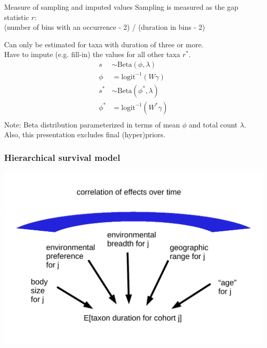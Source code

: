 \documentclass{beamer}
\begin{document}
\begin{frame}
  \begin{block}{Measure of sampling and imputed values}
    Sampling is measured as the gap statistic \(r\): \\(number of bins with an occurrence - 2) / (duration in bins - 2)

    Can only be estimated for taxa with duration of three or more. \\Have to impute (e.g. fill-in) the values for all other taxa \(r^{\ast}\).
    \begin{align*}
      s &\sim \text{Beta}(\phi, \lambda) \\
      \phi &= \text{logit}^{-1}(W\gamma) \\
      s^{\ast} &\sim \text{Beta}(\phi^{\ast}, \lambda) \\
      \phi^{\ast} &= \text{logit}^{-1}(W^{\ast}\gamma) \\
    \end{align*}
    \scriptsize{Note: Beta distribution parameterized in terms of mean \(\phi\) and total count \(\lambda\). \\Also, this presentation excludes final (hyper)priors.}
  \end{block}
\end{frame}


\begin{frame}
  \frametitle{Hierarchical survival model}
  \begin{center}
    \includegraphics[width = \textwidth,height = 0.8\textheight,keepaspectratio = true]{figure/simple_model}
  \end{center}
\end{frame}
\end{document}
